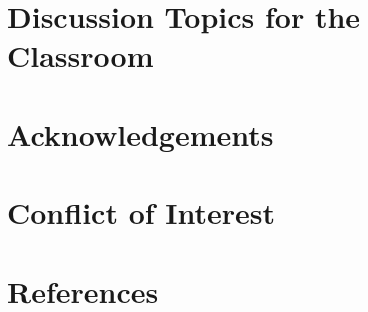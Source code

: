 \documentclass[preprint, 8pt]{elsarticle}
\theoremstyle{definition}
\begin{document}
\section{Discussion Topics for the Classroom}



\section{Acknowledgements}


\section{Conflict of Interest}

\section{References}
\end{document}
